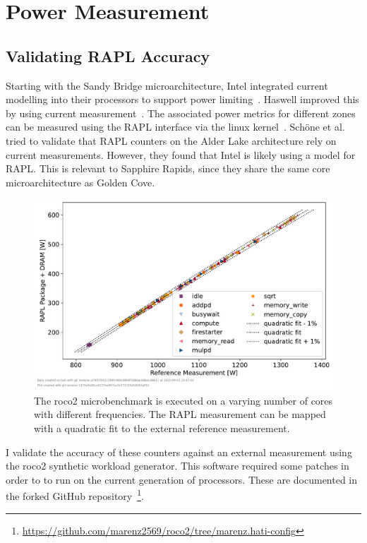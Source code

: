 \chapter{Power Measurement}
\label{sec:power_measurement}

\section{Validating RAPL Accuracy}
\label{sec:validating_rapl_accuracy}
Starting with the Sandy Bridge microarchitecture, Intel integrated current modelling into their processors to support power limiting~\cite{Hackenberg_2013_RAPL_APM}.
Haswell improved this by using current measurement~\cite{Hackenberg_2015_Haswell}.
The associated power metrics for different zones can be measured using the RAPL interface via the linux kernel~\cite{powercap_kernel_doc}.
Schöne et al.~\cite{Schoene_2024_Alder_Lake} tried to validate that RAPL counters on the Alder Lake architecture rely on current measurements.
However, they found that Intel is likely using a model for RAPL.
This is relevant to Sapphire Rapids, since they share the same core microarchitecture as Golden Cove.

\begin{figure}[]
    \centering
    \includegraphics[width=0.8\columnwidth]{fig/rapl-accuracy/rapl-accuracy.pdf}
    \caption{\label{fig:validate-rapl}The roco2 microbenchmark is executed on a varying number of cores with different frequencies.
    The RAPL measurement can be mapped with a quadratic fit to the external reference measurement.}
\end{figure}

I validate the accuracy of these counters against an external measurement using the roco2 synthetic workload generator.
This software required some patches in order to to run on the current generation of processors.
These are documented in the forked GitHub repository~\footnote{\url{https://github.com/marenz2569/roco2/tree/marenz.hati-config}}.

